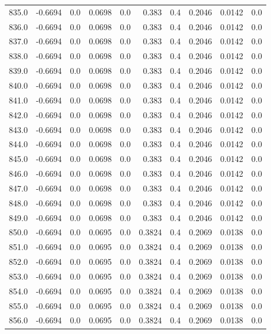 \begin{longtable}{lrrrrrrrrr}
835.0 & -0.6694 & 0.0 & 0.0698 & 0.0 & 0.383 & 0.4 & 0.2046 & 0.0142 & 0.0 \\
836.0 & -0.6694 & 0.0 & 0.0698 & 0.0 & 0.383 & 0.4 & 0.2046 & 0.0142 & 0.0 \\
837.0 & -0.6694 & 0.0 & 0.0698 & 0.0 & 0.383 & 0.4 & 0.2046 & 0.0142 & 0.0 \\
838.0 & -0.6694 & 0.0 & 0.0698 & 0.0 & 0.383 & 0.4 & 0.2046 & 0.0142 & 0.0 \\
839.0 & -0.6694 & 0.0 & 0.0698 & 0.0 & 0.383 & 0.4 & 0.2046 & 0.0142 & 0.0 \\
840.0 & -0.6694 & 0.0 & 0.0698 & 0.0 & 0.383 & 0.4 & 0.2046 & 0.0142 & 0.0 \\
841.0 & -0.6694 & 0.0 & 0.0698 & 0.0 & 0.383 & 0.4 & 0.2046 & 0.0142 & 0.0 \\
842.0 & -0.6694 & 0.0 & 0.0698 & 0.0 & 0.383 & 0.4 & 0.2046 & 0.0142 & 0.0 \\
843.0 & -0.6694 & 0.0 & 0.0698 & 0.0 & 0.383 & 0.4 & 0.2046 & 0.0142 & 0.0 \\
844.0 & -0.6694 & 0.0 & 0.0698 & 0.0 & 0.383 & 0.4 & 0.2046 & 0.0142 & 0.0 \\
845.0 & -0.6694 & 0.0 & 0.0698 & 0.0 & 0.383 & 0.4 & 0.2046 & 0.0142 & 0.0 \\
846.0 & -0.6694 & 0.0 & 0.0698 & 0.0 & 0.383 & 0.4 & 0.2046 & 0.0142 & 0.0 \\
847.0 & -0.6694 & 0.0 & 0.0698 & 0.0 & 0.383 & 0.4 & 0.2046 & 0.0142 & 0.0 \\
848.0 & -0.6694 & 0.0 & 0.0698 & 0.0 & 0.383 & 0.4 & 0.2046 & 0.0142 & 0.0 \\
849.0 & -0.6694 & 0.0 & 0.0698 & 0.0 & 0.383 & 0.4 & 0.2046 & 0.0142 & 0.0 \\
850.0 & -0.6694 & 0.0 & 0.0695 & 0.0 & 0.3824 & 0.4 & 0.2069 & 0.0138 & 0.0 \\
851.0 & -0.6694 & 0.0 & 0.0695 & 0.0 & 0.3824 & 0.4 & 0.2069 & 0.0138 & 0.0 \\
852.0 & -0.6694 & 0.0 & 0.0695 & 0.0 & 0.3824 & 0.4 & 0.2069 & 0.0138 & 0.0 \\
853.0 & -0.6694 & 0.0 & 0.0695 & 0.0 & 0.3824 & 0.4 & 0.2069 & 0.0138 & 0.0 \\
854.0 & -0.6694 & 0.0 & 0.0695 & 0.0 & 0.3824 & 0.4 & 0.2069 & 0.0138 & 0.0 \\
855.0 & -0.6694 & 0.0 & 0.0695 & 0.0 & 0.3824 & 0.4 & 0.2069 & 0.0138 & 0.0 \\
856.0 & -0.6694 & 0.0 & 0.0695 & 0.0 & 0.3824 & 0.4 & 0.2069 & 0.0138 & 0.0 \\

\end{longtable}
